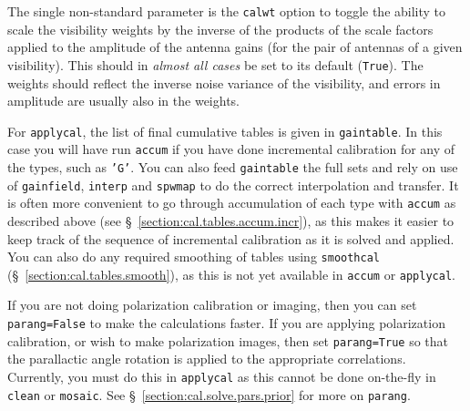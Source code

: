 The single non-standard parameter is the {\tt calwt} option to toggle
the ability to scale the visibility weights by the inverse of the 
products of the scale factors applied to the amplitude of the antenna
gains (for the pair of antennas of a given visibility).  
This should in {\em almost all cases} be set to its default ({\tt True}).
The weights should reflect the inverse noise variance of the
visibility, and errors in amplitude are usually also in the weights.

For {\tt applycal}, the list of final cumulative tables is given in 
{\tt gaintable}.  In this case you will have run {\tt accum} if you
have done incremental calibration for any of the types, such as {\tt 'G'}. 
You can also feed {\tt gaintable} the full sets and rely on use of
{\tt gainfield}, {\tt interp} and {\tt spwmap} to do the correct 
interpolation and transfer.  It is often more convenient to go through
accumulation of each type with {\tt accum} as described above
(see \S~\ref{section:cal.tables.accum.incr}), as this makes it easier
to keep track of the sequence of incremental calibration as it is
solved and applied.  You can also do any required smoothing of tables
using {\tt smoothcal} (\S~\ref{section:cal.tables.smooth}), as this
is not yet available in {\tt accum} or {\tt applycal}.

If you are not doing polarization calibration or imaging, then you can set 
{\tt parang=False} to make the calculations faster.  If you are
applying polarization calibration, or wish to make polarization
images, then set {\tt parang=True} so that the parallactic angle
rotation is applied to the appropriate correlations.  Currently,
you must do this in {\tt applycal} as this cannot be done on-the-fly
in {\tt clean} or {\tt mosaic}.  
See \S~\ref{section:cal.solve.pars.prior} for more on {\tt parang}.


